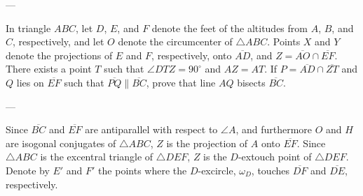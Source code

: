 
---

In triangle $ABC$, let $D$, $E$, and $F$ denote the feet of the altitudes from $A$, $B$, and $C$, respectively, and let $O$ denote the circumcenter of $\triangle ABC$. Points $X$ and $Y$ denote the projections of $E$ and $F$, respectively, onto $\overline{AD}$, and $Z=\overline{AO}\cap\overline{EF}$. There exists a point $T$ such that $\angle DTZ=90^\circ$ and $AZ=AT$. If $P=\overline{AD}\cap\overline{ZT}$ and $Q$ lies on $\overline{EF}$ such that $\overline{PQ}\parallel\overline{BC}$, prove that line $AQ$ bisects $\overline{BC}$.

---

Since $\overline{BC}$ and $\overline{EF}$ are antiparallel with respect to $\angle A$, and furthermore $O$ and $H$ are isogonal conjugates of $\triangle ABC$, $Z$ is the projection of $A$ onto $\overline{EF}$. Since $\triangle ABC$ is the excentral triangle of $\triangle DEF$, $Z$ is the $D$-extouch point of $\triangle DEF$. Denote by $E'$ and $F'$ the points where the $D$-excircle, $\omega_D$, touches $\overline{DF}$ and $\overline{DE}$, respectively.
